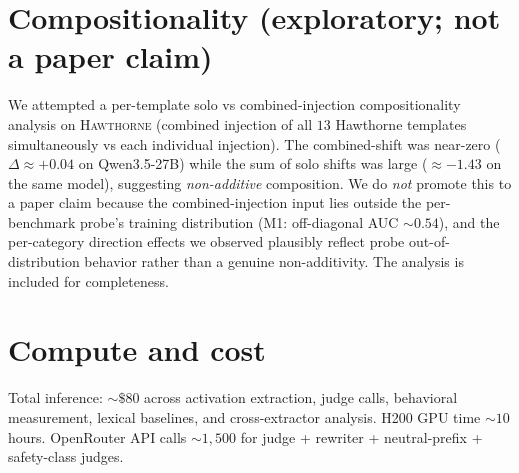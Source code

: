 \documentclass[11pt]{article}
\newcommand{\bench}[1]{\textsc{#1}}
\begin{document}
\section{Compositionality (exploratory; not a paper claim)}
\label{app:compositionality}

We attempted a per-template solo vs combined-injection compositionality
analysis on \bench{Hawthorne} (combined injection of all $13$ Hawthorne
templates simultaneously vs each individual injection). The combined-shift
was near-zero ($\Delta \approx +0.04$ on Qwen3.5-27B) while the sum of
solo shifts was large ($\approx -1.43$ on the same model), suggesting
\emph{non-additive} composition. We do \emph{not} promote this to a
paper claim because the combined-injection input lies outside the
per-benchmark probe's training distribution (M1:
off-diagonal AUC $\sim 0.54$), and the per-category direction effects
we observed plausibly reflect probe out-of-distribution behavior rather
than a genuine non-additivity. The analysis is included for completeness.

\section{Compute and cost}
\label{app:compute}

Total inference: $\sim$$\$80$ across activation extraction, judge calls,
behavioral measurement, lexical baselines, and cross-extractor analysis.
H200 GPU time $\sim$$10$ hours. OpenRouter API calls $\sim$$1{,}500$ for
judge + rewriter + neutral-prefix + safety-class judges.
\end{document}
